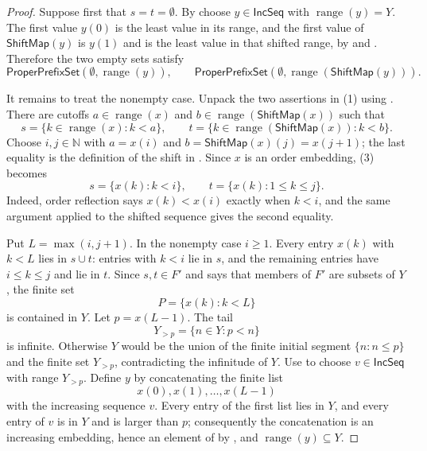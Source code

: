 \begin{proof}
Suppose first that $s=t=\emptyset$.  By 
choose $y\in\mathsf{IncSeq}$ with $\operatorname{range}(y)=Y$.  The first
value $y(0)$ is the least value in its range, and the first value of
$\mathsf{ShiftMap}(y)$ is $y(1)$ and is the least value in that shifted
range, by  and .  Therefore the two
empty sets satisfy
\[
 \mathsf{ProperPrefixSet}(\emptyset,\operatorname{range}(y)),\qquad
 \mathsf{ProperPrefixSet}(\emptyset,
       \operatorname{range}(\mathsf{ShiftMap}(y))).                \tag{2}
\]

It remains to treat the nonempty case.  Unpack the two assertions in (1)
using .  There are cutoffs
$a\in\operatorname{range}(x)$ and
$b\in\operatorname{range}(\mathsf{ShiftMap}(x))$ such that
\[
 s=\{k\in\operatorname{range}(x):k<a\},\qquad
 t=\{k\in\operatorname{range}(\mathsf{ShiftMap}(x)):k<b\}.          \tag{3}
\]
Choose $i,j\in\mathbb N$ with $a=x(i)$ and
$b=\mathsf{ShiftMap}(x)(j)=x(j+1)$; the last equality is the definition
of the shift in .  Since $x$ is an order embedding, (3)
becomes
\[
 s=\{x(k):k<i\},\qquad t=\{x(k):1\leq k\leq j\}.                 \tag{4}
\]
Indeed, order reflection says $x(k)<x(i)$ exactly when $k<i$, and the
same argument applied to the shifted sequence gives the second equality.

Put $L=\max(i,j+1)$.  In the nonempty case $i\geq1$.  Every entry
$x(k)$ with $k<L$ lies in $s\cup t$: entries with $k<i$ lie in $s$, and
the remaining entries have $i\leq k\leq j$ and lie in $t$.  Since
$s,t\in F'$ and  says that members of $F'$ are
subsets of $Y$, the finite set
\[
 P=\{x(k):k<L\}
\]
is contained in $Y$.  Let $p=x(L-1)$.  The tail
\[
 Y_{>p}=\{n\in Y:p<n\}
\]
is infinite.  Otherwise $Y$ would be the union of the finite initial
segment $\{n:n\leq p\}$ and the finite set $Y_{>p}$, contradicting the
infinitude of $Y$.  Use  to choose
$v\in\mathsf{IncSeq}$ with range $Y_{>p}$.  Define $y$ by concatenating
the finite list
\[
 x(0),x(1),\ldots,x(L-1)
\]
with the increasing sequence $v$.  Every entry of the first list lies in
$Y$, and every entry of $v$ is in $Y$ and is larger than $p$; consequently
the concatenation is an increasing embedding, hence an element of
 by , and
$\operatorname{range}(y)\subseteq Y$.


\end{proof}
